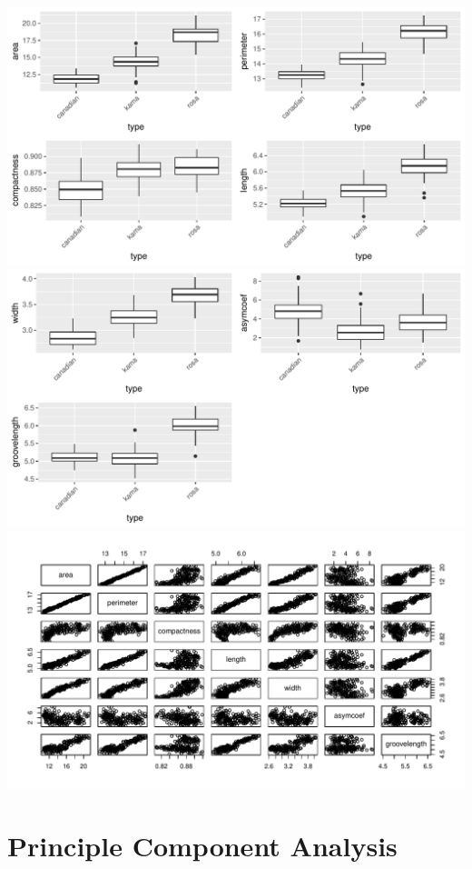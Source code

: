 \documentclass[]{article}
\begin{document}
\includegraphics{Project2_files/figure-latex/EDA - Mer-1.pdf}
\includegraphics{Project2_files/figure-latex/EDA - Mer-2.pdf}
\includegraphics{Project2_files/figure-latex/EDA - Mer-3.pdf}

\section{Principle Component
Analysis}\label{principle-component-analysis}
\end{document}
